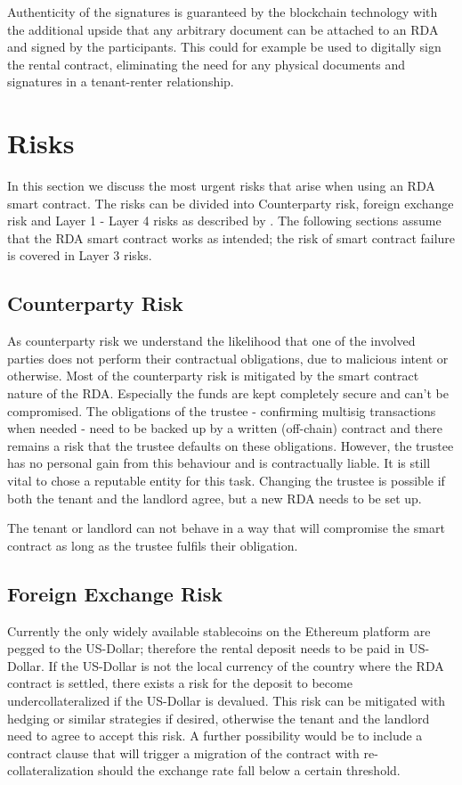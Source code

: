 \documentclass[12pt,a4paper,titlepage,oneside,english]{article}
\begin{document}
Authenticity of the signatures is guaranteed by the blockchain technology with the additional upside that any arbitrary document can be attached to an RDA and signed by the participants. This could for example be used to digitally sign the rental contract, eliminating the need for any physical documents and signatures in a tenant-renter relationship.



\section{Risks}
\label{sec:risks}
In this section we discuss the most urgent risks that arise when using an RDA smart contract. The risks can be divided into Counterparty risk, foreign exchange risk and Layer 1 - Layer 4 risks as described by \cite{Schaer2020}. The following sections assume that the RDA smart contract works as intended; the risk of smart contract failure is covered in Layer 3 risks.

\subsection{Counterparty Risk}
As counterparty risk we understand the likelihood that one of the involved parties does not perform their contractual obligations, due to malicious intent or otherwise.
Most of the counterparty risk is mitigated by the smart contract nature of the RDA. Especially the funds are kept completely secure and can't be compromised. The obligations of the trustee - confirming multisig transactions when needed - need to be backed up by a written (off-chain) contract and there remains a risk that the trustee defaults on these obligations. However, the trustee has no personal gain from this behaviour and is contractually liable. It is still vital to chose a reputable entity for this task. Changing the trustee is possible if both the tenant and the landlord agree, but a new RDA needs to be set up.

The tenant or landlord can not behave in a way that will compromise the smart contract as long as the trustee fulfils their obligation.

\subsection{Foreign Exchange Risk}
Currently the only widely available stablecoins on the Ethereum platform are pegged to the US-Dollar; therefore the rental deposit needs to be paid in US-Dollar. If the US-Dollar is not the local currency of the country where the RDA contract is settled, there exists a risk for the deposit to become undercollateralized if the US-Dollar is devalued. This risk can be mitigated with hedging or similar strategies if desired, otherwise the tenant and the landlord need to agree to accept this risk. A further possibility would be to include a contract clause that will trigger a migration of the contract with re-collateralization should the exchange rate fall below a certain threshold.
\end{document}
